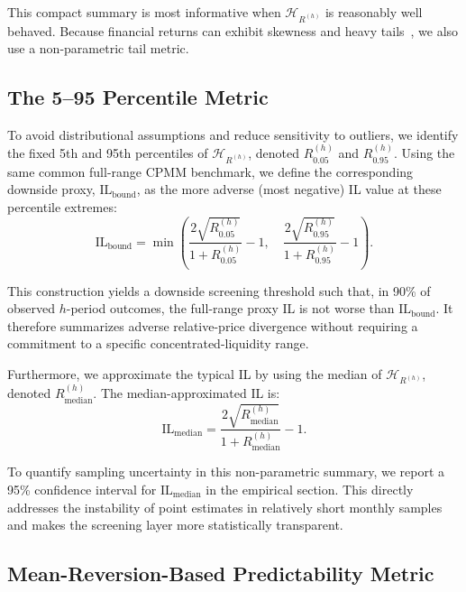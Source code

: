 \documentclass[10pt,conference,compsocconf]{IEEEtran}
\begin{document}
This compact summary is most informative when $\mathcal{H}_{R^{(h)}}$ is reasonably well behaved. Because financial returns can exhibit skewness and heavy tails~\cite{mandelbrot2004fractals}, we also use a non-parametric tail metric.

\subsection{The 5--95 Percentile Metric}

To avoid distributional assumptions and reduce sensitivity to outliers, we identify the fixed 5th and 95th percentiles of $\mathcal{H}_{R^{(h)}}$, denoted $R^{(h)}_{0.05}$ and $R^{(h)}_{0.95}$.
{Using the same common full-range CPMM benchmark, we define the corresponding downside proxy, $\mathrm{IL}_{\text{bound}}$, as the more adverse (most negative) IL value at these percentile extremes:}
\begin{equation}
\label{eq:il_bound}
\mathrm{IL}_{\text{bound}} = \min\left(
\frac{2\sqrt{R^{(h)}_{0.05}}}{1+R^{(h)}_{0.05}} - 1,\quad
\frac{2\sqrt{R^{(h)}_{0.95}}}{1+R^{(h)}_{0.95}} - 1
\right).
\end{equation}

{This construction yields a downside screening threshold such that, in 90\% of observed $h$-period outcomes, the full-range proxy IL is not worse than $\mathrm{IL}_{\text{bound}}$. It therefore summarizes adverse relative-price divergence without requiring a commitment to a specific concentrated-liquidity range.}

Furthermore, we approximate the typical IL by using the median of \(\mathcal{H}_{R^{(h)}}\), denoted \(R^{(h)}_{\text{median}}\). The median-approximated IL is:
\begin{equation}
\label{eq:il_median}
\mathrm{IL}_{\text{median}} = \frac{2\sqrt{R^{(h)}_{\text{median}}}}{1+R^{(h)}_{\text{median}}} - 1.
\end{equation}

{To quantify sampling uncertainty in this non-parametric summary, we report a 95\% confidence interval for $\mathrm{IL}_{\text{median}}$ in the empirical section. This directly addresses the instability of point estimates in relatively short monthly samples and makes the screening layer more statistically transparent.}

\subsection{Mean-Reversion-Based Predictability Metric}
\label{subsubsec:mean_reversion_metric}
\end{document}
